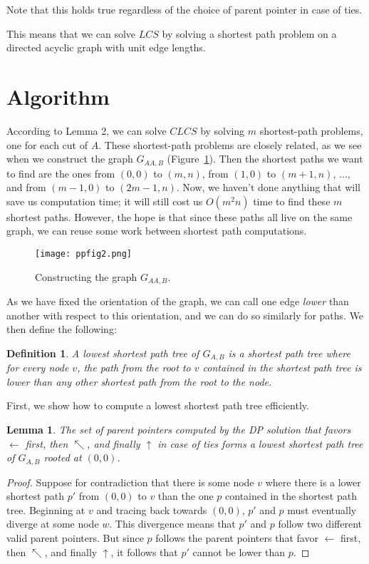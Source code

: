\documentclass{article}
\newtheorem{definition}{Definition}
\newtheorem{lemma}{Lemma}
\begin{document}
Note that this holds true regardless of the choice of parent pointer in case of ties.

This means that we can solve $LCS$ by solving a shortest path problem on a directed acyclic graph with unit edge lengths.

\section{Algorithm}

According to Lemma 2, we can solve $CLCS$ by solving $m$ shortest-path problems, one for each cut of $A$.  These shortest-path problems are closely related, as we see when we construct the graph $G_{AA,B}$ (Figure~\ref{fig:biggraph}).  Then the shortest paths we want to find are the ones from $(0,0)$ to $(m,n)$, from $(1,0)$ to $(m+1,n)$, $\dots$, and from $(m-1,0)$ to $(2m-1,n)$.  Now, we haven't done anything that will save us computation time; it will still cost us $O(m^2 n)$ time to find these $m$ shortest paths.  However, the hope is that since these paths all live on the same graph, we can reuse some work between shortest path computations.

\begin{figure}[htb]
  \centering
  \texttt{[image: ppfig2.png]}
  \caption{Constructing the graph $G_{AA,B}$.}
  \label{fig:biggraph}
\end{figure}

As we have fixed the orientation of the graph, we can call one edge \emph{lower} than another with respect to this orientation, and we can do so similarly for paths.  We then define the following:

\begin{definition}
A \emph{lowest shortest path tree} of $G_{A,B}$ is a shortest path tree where for every node $v$, the path from the root to $v$ contained in the shortest path tree is lower than any other shortest path from the root to the node.
\end{definition}

First, we show how to compute a lowest shortest path tree efficiently.

\begin{lemma}
The set of parent pointers computed by the DP solution that favors $\leftarrow$  first, then $\nwarrow$, and finally $\uparrow$ in case of ties forms a lowest shortest path tree of $G_{A,B}$ rooted at $(0,0)$.
\end{lemma}
\begin{proof}
Suppose for contradiction that there is some node $v$ where there is a lower shortest path $p'$ from $(0,0)$ to $v$ than the one $p$ contained in the shortest path tree.  Beginning at $v$ and tracing back towards $(0,0)$, $p'$ and $p$ must eventually diverge at some node $w$.  This divergence means that $p'$ and $p$ follow two different valid parent pointers.  But since $p$ follows the parent pointers that favor $\leftarrow$  first, then $\nwarrow$, and finally $\uparrow$, it follows that $p'$ cannot be lower than $p$.
\end{proof}
\end{document}

